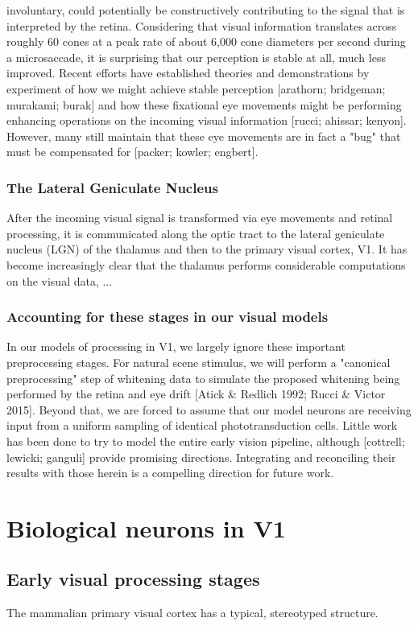 involuntary, could potentially be constructively contributing to the signal that is interpreted by the retina. Considering that visual information translates across roughly 60 cones at a peak rate of about 6,000 cone diameters per second during a microsaccade, it is surprising that our perception is stable at all, much less improved. Recent efforts have established theories and demonstrations by experiment of how we might achieve stable perception [arathorn; bridgeman; murakami; burak] and how these fixational eye movements might be performing enhancing operations on the incoming visual information [rucci; ahissar; kenyon]. However, many still maintain that these eye movements are in fact a "bug" that must be compensated for [packer; kowler; engbert].


\subsubsection{The Lateral Geniculate Nucleus} After the incoming visual signal is transformed via eye movements and retinal processing, it is communicated along the optic tract to the lateral geniculate nucleus (LGN) of the thalamus and then to the primary visual cortex, V1. It has become increasingly clear that the thalamus performs considerable computations on the visual data, ...


\subsubsection{Accounting for these stages in our visual models} In our models of processing in V1, we largely ignore these important preprocessing stages. For natural scene stimulus, we will perform a "canonical preprocessing" step of whitening data to simulate the proposed whitening being performed by the retina and eye drift [Atick & Redlich 1992; Rucci & Victor 2015]. Beyond that, we are forced to assume that our model neurons are receiving input from a uniform sampling of identical phototransduction cells. Little work has been done to try to model the entire early vision pipeline, although [cottrell; lewicki; ganguli] provide promising directions. Integrating and reconciling their results with those herein is a compelling direction for future work.

\section{Biological neurons in V1}


\subsection{Early visual processing stages}
The mammalian primary visual cortex has a typical, stereotyped structure. 


